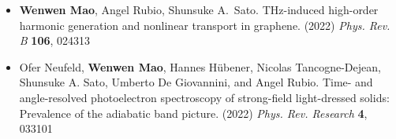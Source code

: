 \documentclass[a4paper, twoside]{NUSThesis}
\begin{document}
{\begin{itemize}
	\item \textbf{Wenwen Mao}, Angel Rubio, Shunsuke A.~Sato. THz-induced high-order harmonic generation and nonlinear transport in graphene. (2022) {\it Phys. Rev. B} \textbf{106}, 024313
	\item Ofer Neufeld, \textbf{Wenwen Mao}, Hannes Hübener, Nicolas Tancogne-Dejean, Shunsuke A. Sato, Umberto De Giovannini, and Angel Rubio. Time- and angle-resolved photoelectron spectroscopy of strong-field light-dressed solids: Prevalence of the adiabatic band picture. (2022) { \it Phys. Rev. Research} \textbf{4}, 033101
\end{itemize}
}

\printglossary[type=symbols, style=long, title={List of Abbreviations}]
\mainmatter
%






\appendix


%
\backmatter
\begingroup
\onehalfspacing
\printbibliography[heading=bibintoc]
\endgroup
\end{document}
